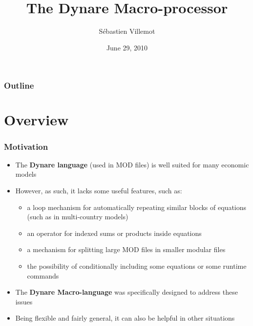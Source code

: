 \documentclass{beamer}
\title{The Dynare Macro-processor}
\author{Sébastien Villemot}
\institute{CEPREMAP}
\date{June 29, 2010}
\begin{document}
\begin{frame}
  \titlepage
\end{frame}

\begin{frame}
  \frametitle{Outline}
  \tableofcontents
\end{frame}

\section{Overview}

\begin{frame}
  \frametitle{Motivation}
  \begin{itemize}
  \item The \textbf{Dynare language} (used in MOD files) is well suited for many economic models
  \item However, as such, it lacks some useful features, such as:
    \begin{itemize}
    \item a loop mechanism for automatically repeating similar blocks of equations (such as in multi-country models)
    \item an operator for indexed sums or products inside equations
    \item a mechanism for splitting large MOD files in smaller modular files
    \item the possibility of conditionally including some equations or some runtime commands
  \end{itemize}
  \item The \textbf{Dynare Macro-language} was specifically designed to address these issues
  \item Being flexible and fairly general, it can also be helpful in other situations
  \end{itemize}
\end{frame}
\end{document}
